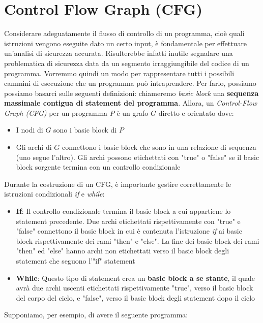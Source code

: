 \documentclass[../main.tex]{subfiles}
\begin{document}
\section{Control Flow Graph (CFG)}
Considerare adeguatamente il flusso di controllo di un programma, cioè quali istruzioni vengono eseguite dato un certo input, è fondamentale per effettuare un'analisi di sicurezza accurata. Risulterebbe infatti inutile segnalare
una problematica di sicurezza data da un segmento irraggiungibile del codice di un programma. Vorremmo quindi un modo per rappresentare tutti i possibili cammini di esecuzione che un programma può intraprendere.
Per farlo, possiamo possiamo basarci sulle seguenti definizioni: chiameremo \textit{basic block} una \textbf{sequenza massimale contigua di statement del programma}. Allora, un \textit{Control-Flow Graph (CFG)} per un programma $P$ è un grafo $G$ diretto e orientato dove:
\begin{itemize}
    \item I nodi di $G$ sono i basic block di $P$
    \item Gli archi di $G$ connettono i basic block che sono in una relazione di sequenza (uno segue l'altro). Gli archi possono etichettati con "true" o "false" se il basic block sorgente termina con un controllo condizionale 
\end{itemize}
Durante la costruzione di un CFG, è importante gestire correttamente le istruzioni condizionali \textit{if} e \textit{while}:
\begin{itemize}
    \item \textbf{If}: Il controllo condizionale termina il basic block a cui appartiene lo statement precedente. Due archi etichettati rispettivamente con "true" e "false" connettono il basic
    block in cui è contenuta l'istruzione \textit{if} ai basic block rispettivamente dei rami "then" e "else". La fine dei basic block dei rami "then" ed "else" hanno archi non etichettati
    verso il basic block degli statement che seguono l’"if" statement
    \item \textbf{While}: Questo tipo di statement crea un \textbf{basic block a se stante}, il quale avrà due archi uscenti etichettati rispettivamente "true", verso il
    basic block del corpo del ciclo, e "false", verso il basic block degli statement dopo il ciclo
\end{itemize}
\newpage \noindent
Supponiamo, per esempio, di avere il seguente programma:

\end{document}
